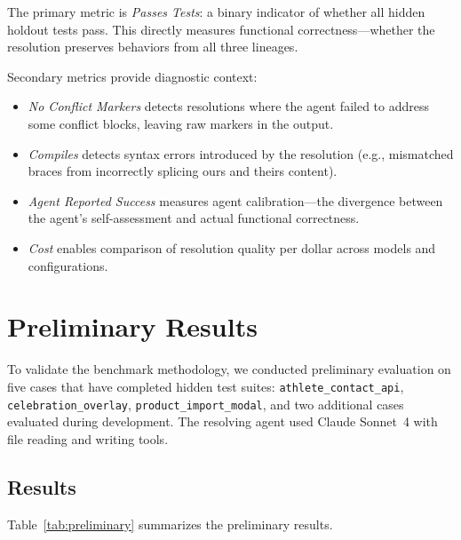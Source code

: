 \documentclass[11pt,a4paper]{article}
\begin{document}
The primary metric is \emph{Passes Tests}: a binary indicator of whether all hidden holdout tests pass. This directly measures functional correctness---whether the resolution preserves behaviors from all three lineages.

Secondary metrics provide diagnostic context:

\begin{itemize}[leftmargin=2em]
\item \emph{No Conflict Markers} detects resolutions where the agent failed to address some conflict blocks, leaving raw markers in the output.
\item \emph{Compiles} detects syntax errors introduced by the resolution (e.g., mismatched braces from incorrectly splicing ours and theirs content).
\item \emph{Agent Reported Success} measures agent calibration---the divergence between the agent's self-assessment and actual functional correctness.
\item \emph{Cost} enables comparison of resolution quality per dollar across models and configurations.
\end{itemize}

\section{Preliminary Results}
\label{sec:results}

To validate the benchmark methodology, we conducted preliminary evaluation on five cases that have completed hidden test suites: \texttt{athlete\_contact\_api}, \texttt{celebration\_overlay}, \texttt{product\_import\_modal}, and two additional cases evaluated during development. The resolving agent used Claude Sonnet~4 with file reading and writing tools.

\subsection{Results}

Table~\ref{tab:preliminary} summarizes the preliminary results.
\end{document}

